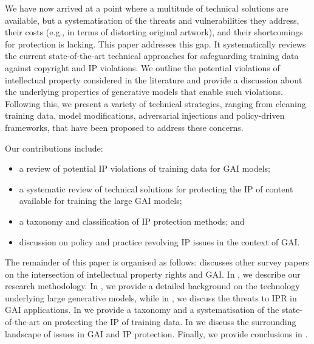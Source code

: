 \documentclass[conference,table]{IEEEtran}
\begin{document}
We have now arrived at a point where a multitude of technical solutions are available, but a systematisation of the threats and vulnerabilities they address, their costs (e.g., in terms of distorting original artwork), and their shortcomings for protection is lacking.
This paper addresses this gap. It systematically reviews the current state-of-the-art technical approaches for safeguarding training data against copyright and IP violations. 
We outline the potential violations of intellectual property considered in the literature and provide a discussion about the underlying properties of generative models that enable such violations. 
Following this, we present a variety of technical strategies, ranging from cleaning training data, model modifications, adversarial injections and policy-driven frameworks, that have been proposed to address these concerns. 

Our contributions include:
\begin{itemize}
    \item a review of potential IP violations of training data for GAI models;
    \item a systematic review of technical solutions for protecting the IP of content available for training the large GAI models; 
    \item a taxonomy and classification of IP protection methods; and
    \item discussion on policy and practice revolving IP issues in the context of GAI.
\end{itemize}

The remainder of this paper is organised as follows:  discusses other survey papers on the intersection of intellectual property rights and GAI. In , we describe our research methodology. In , we provide a detailed background on the technology underlying large generative models, while in , we discuss the threats to IPR in GAI applications. In  we provide a taxonomy and a systematisation of the state-of-the-art on protecting the IP of training data. 
In  we discuss the surrounding landscape of issues in GAI and IP protection. Finally, we provide conclusions in .
\end{document}
